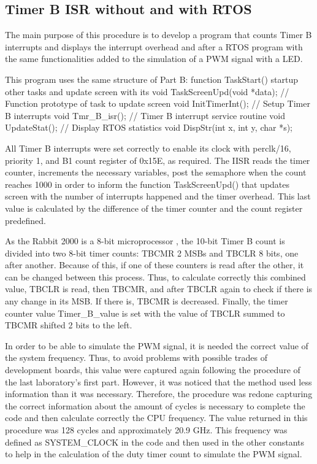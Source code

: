 \subsection{Timer B ISR without and with RTOS}

The main purpose of this procedure is to develop a program that counts Timer B interrupts and displays the interrupt overhead and after a RTOS program with the same functionalities added to the simulation of a PWM signal with a LED.

This program uses the same structure of Part B: function TaskStart() startup other tasks and update screen with its 
void TaskScreenUpd(void *data); // Function prototype of task to update screen
void InitTimerInt();            // Setup Timer B interrupts
void Tmr_B_isr();               // Timer B interrupt service routine
void UpdateStat();              // Display RTOS statistics
void DispStr(int x, int y, char *s);

All Timer B interrupts were set correctly to enable its clock with perclk/16, priority 1, and B1 count register of 0x15E, as required. The IISR reads the timer counter, increments the necessary variables, post the semaphore when the count reaches 1000 in order to inform the function TaskScreenUpd() that updates screen with the number of interrupts happened and the timer overhead. This last value is calculated by the difference of the timer counter and the count register predefined.

As the Rabbit 2000 is a 8-bit microprocessor \cite{Digi_International_2007}, the 10-bit Timer B count is divided into two 8-bit timer counts: TBCMR 2 MSBs and TBCLR 8 bits, one after another. Because of this, if one of these counters is read after the other, it can be changed between this process. Thus, to calculate correctly this combined value, TBCLR is read, then TBCMR, and after TBCLR again to check if there is any change in its MSB. If there is, TBCMR is decreased. Finally, the timer counter value Timer_B_value is set with the value of TBCLR summed to TBCMR shifted 2 bits to the left. 

In order to be able to simulate the PWM signal, it is needed the correct value of the system frequency. Thus, to avoid problems with possible trades of development boards, this value were captured again following the procedure of the last laboratory's first part. However, it was noticed that the method used less information than it was necessary. Therefore, the procedure was redone capturing the correct information about the amount of cycles is necessary to complete the code and then calculate correctly the CPU frequency. The value returned in this procedure was 128 cycles and approximately 20.9 GHz. This frequency was defined as SYSTEM_CLOCK in the code and then used in the other constants to help in the calculation of the duty timer count to simulate the PWM signal.